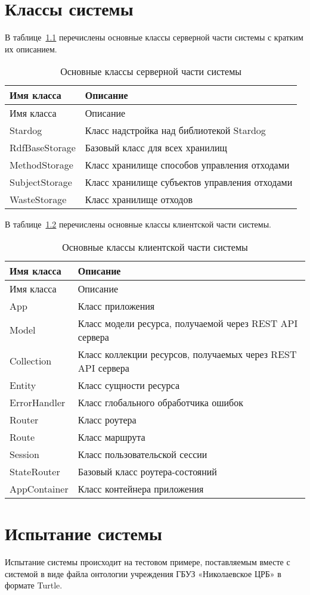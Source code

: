 \documentclass[a4paper]{G2-105}
\begin{document}
\chapter{Классы системы}

В таблице~\ref{tab:classes_server} перечислены основные классы серверной части системы с кратким их описанием.

\begin{longtable}[l]{|p{5.5cm}|p{9cm}|}
\caption{Основные классы серверной части системы}
\label{tab:classes_server}\tabularnewline
\hline
Имя класса & Описание\tabularnewline
\endfirsthead
\hline
Имя класса & Описание\tabularnewline
\endhead
\hline
Stardog & Класс надстройка над библиотекой Stardog  \tabularnewline
\hline
RdfBaseStorage & Базовый класс для всех хранилищ \tabularnewline
\hline
MethodStorage & Класс хранилище способов управления отходами \tabularnewline
\hline
SubjectStorage & Класс хранилище субъектов управления отходами \tabularnewline
\hline
WasteStorage & Класс хранилище отходов \tabularnewline
\end{longtable}

В таблице~\ref{tab:classes_client} перечислены основные классы клиентской части системы.

\begin{longtable}[l]{|p{5.5cm}|p{9cm}|}
\caption{Основные классы клиентской части системы}
\label{tab:classes_client}\tabularnewline
\hline
Имя класса & Описание\tabularnewline
\endfirsthead
\hline
Имя класса & Описание\tabularnewline
\endhead
\hline
App & Класс приложения \tabularnewline
\hline
Model & Класс модели ресурса, получаемой через REST API сервера \tabularnewline
\hline
Collection & Класс коллекции ресурсов, получаемых через REST API сервера \tabularnewline
\hline
Entity & Класс сущности ресурса \tabularnewline
\hline
ErrorHandler & Класс глобального обработчика ошибок \tabularnewline
\hline
Router & Класс роутера \tabularnewline
\hline
Route & Класс маршрута \tabularnewline
\hline
Session & Класс пользовательской сессии \tabularnewline
\hline
StateRouter & Базовый класс роутера-состояний \tabularnewline
\hline
AppContainer & Класс контейнера приложения \tabularnewline
\end{longtable}

\chapter{Испытание системы}

Испытание системы происходит на тестовом примере, поставляемым вместе с системой в виде файла онтологии учреждения ГБУЗ «Николаевское ЦРБ» в формате Turtle.
\end{document}
